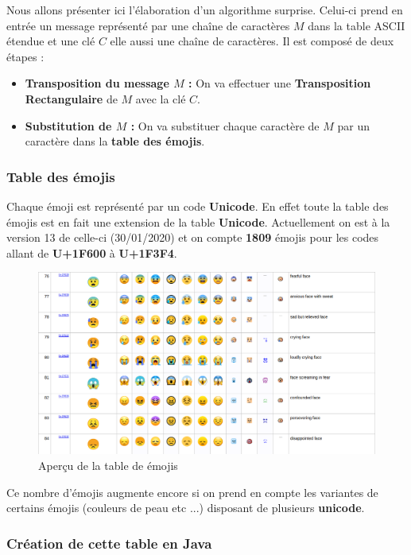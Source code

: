 \documentclass{article}
\begin{document}
Nous allons présenter ici l'élaboration d'un algorithme surprise. Celui-ci prend en entrée un message représenté par une chaîne de caractères $M$ dans la table ASCII étendue et une clé $C$ elle aussi une chaîne de caractères. Il est composé de deux étapes : 
\begin{itemize}
\item \textbf{Transposition du message $M$ : } On va effectuer une \textbf{Transposition Rectangulaire} de $M$ avec la clé $C$. 
\item \textbf{Substitution de $M$ : } On va substituer chaque caractère de $M$ par un caractère dans la \textbf{table des émojis}. 
\end{itemize}

\subsubsection{Table des émojis}

Chaque émoji est représenté par un code \textbf{Unicode}. En effet toute la table des émojis est en fait une extension de la table \textbf{Unicode}. 
Actuellement on est à la version 13 de celle-ci (30/01/2020) et on compte \textbf{1809} émojis pour les codes allant de \textbf{U+1F600} à \textbf{U+1F3F4}.

\begin{figure}[h!]
\centering
\includegraphics[scale=0.35]{./img/emoji.png}
\caption{Aperçu de la table de émojis \label{fig:emoji}}
\end{figure}


Ce nombre d'émojis augmente encore si on prend en compte les variantes de certains émojis (couleurs de peau etc ...) disposant de plusieurs \textbf{unicode}.

\subsubsection{Création de cette table en Java}
\end{document}
